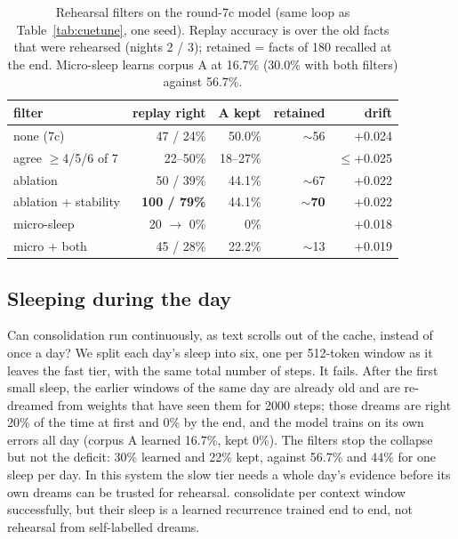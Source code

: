 \documentclass[11pt]{article}
\begin{document}
\begin{table}[t]\centering\small
\caption{Rehearsal filters on the round-7c model (same loop as
Table~\ref{tab:cuetune}, one seed). Replay accuracy is over the old facts that
were rehearsed (nights 2 / 3); retained = facts of 180 recalled at the end.
Micro-sleep learns corpus A at 16.7\% (30.0\% with both filters) against 56.7\%.}\label{tab:filters}
\begin{tabular}{lrrrr}\toprule
filter & replay right & A kept & retained & drift\\\midrule
none (7c) & 47 / 24\% & 50.0\% & $\sim$56 & +0.024\\
agree $\geq$4/5/6 of 7 & 22--50\% & 18--27\% & & $\leq$+0.025\\
ablation & 50 / 39\% & 44.1\% & $\sim$67 & +0.022\\
ablation + stability & \textbf{100 / 79\%} & 44.1\% & $\sim$\textbf{70} & +0.022\\\midrule
micro-sleep & 20 $\to$ 0\% & 0\% & & +0.018\\
micro + both & 45 / 28\% & 22.2\% & $\sim$13 & +0.019\\\bottomrule
\end{tabular}\end{table}

\subsection{Sleeping during the day}
\label{sec:micro}
Can consolidation run continuously, as text scrolls out of the cache, instead
of once a day? We split each day's sleep into six, one per 512-token window as
it leaves the fast tier, with the same total number of steps. It fails. After
the first small sleep, the earlier windows of the same day are already old and
are re-dreamed from weights that have seen them for 2000 steps; those dreams
are right 20\% of the time at first and 0\% by the end, and the model trains
on its own errors all day (corpus A learned 16.7\%, kept 0\%). The filters
stop the collapse but not the deficit: 30\% learned and 22\% kept, against
56.7\% and 44\% for one sleep per day. In this system the slow tier needs a
whole day's evidence before its own dreams can be trusted for rehearsal.
\citet{lee2026sleep} consolidate per context window successfully, but their
sleep is a learned recurrence trained end to end, not rehearsal from
self-labelled dreams.
\end{document}
